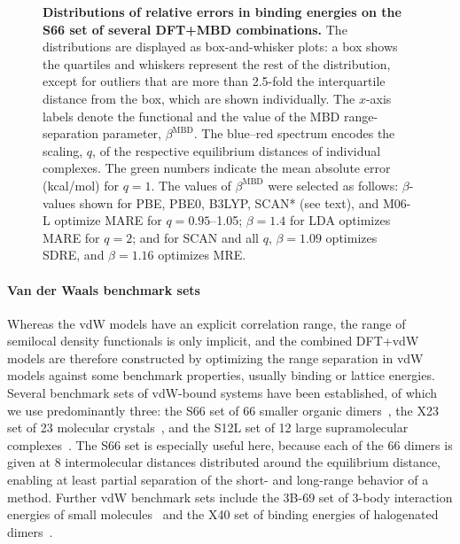 \begin{figure}[t!]
\caption{\textbf{Distributions of relative errors in binding energies on the S66 set of several DFT+MBD combinations.}
The distributions are displayed as box-and-whisker plots: a box shows the quartiles and whiskers represent the rest of the distribution, except for outliers that are more than 2.5-fold the interquartile distance from the box, which are shown individually.
The $x$-axis labels denote the functional and the value of the MBD range-separation parameter, $\beta^\text{MBD}$.
The blue--red spectrum encodes the scaling, $q$, of the respective equilibrium distances of individual complexes.
The green numbers indicate the mean absolute error (kcal/mol) for $q=1$.
The values of $\beta^\text{MBD}$ were selected as follows: $\beta$-values shown for PBE, PBE0, B3LYP, SCAN* (see text), and M06-L optimize MARE for $q=0.95$--1.05; $\beta=1.4$ for LDA optimizes MARE for $q=2$; and for SCAN and all $q$, $\beta=1.09$ optimizes SDRE, and $\beta=1.16$ optimizes MRE\@.
}\label{fig:s66-dists}
\end{figure}

\paragraph{Van der Waals benchmark sets}

Whereas the vdW models have an explicit correlation range, the range of semilocal density functionals is only implicit, and the combined DFT+vdW models are therefore constructed by optimizing the range separation in vdW models against some benchmark properties, usually binding or lattice energies.
Several benchmark sets of vdW-bound systems have been established, of which we use predominantly three: the S66 set of 66 smaller organic dimers~\cite{RezacJCTC11}, the X23 set of 23 molecular crystals~\cite{Otero-de-la-RozaJCP12,ReillyJCP13}, and the S12L set of 12 large supramolecular complexes~\cite{GrimmeCEJ12}.
The S66 set is especially useful here, because each of the 66 dimers is given at 8 intermolecular distances distributed around the equilibrium distance, enabling at least partial separation of the short- and long-range behavior of a method.
Further vdW benchmark sets include the 3B-69 set of 3-body interaction energies of small molecules~\cite{RezacJCTC15} and the X40 set of binding energies of halogenated dimers~\cite{RezacJCTC12}.

